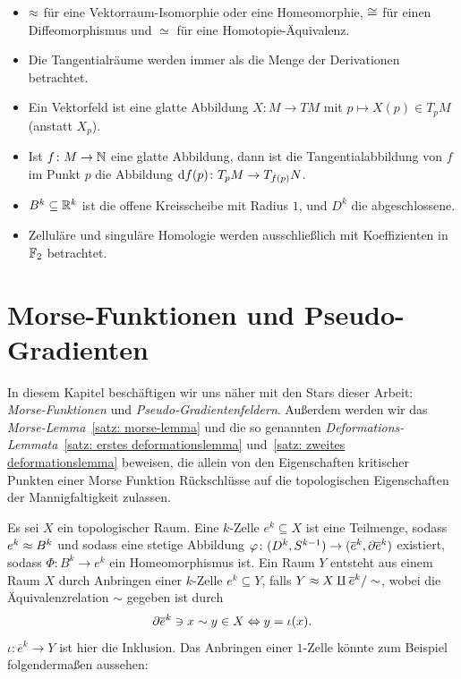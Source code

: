\documentclass[a4paper,11pt,twoside]{scrreport}
\begin{document}
\begin{itemize}
    \item $\approx$ für eine Vektorraum-Isomorphie oder eine Homeomorphie, $\cong$ für einen Diffeomorphismus
        und $\simeq$ für eine Homotopie-Äquivalenz.
    \item Die Tangentialräume werden immer als die Menge der Derivationen betrachtet.
    \item Ein Vektorfeld ist eine glatte Abbildung $X \colon M \to TM$ mit 
        $p \mapsto X(p) \in T_pM$ (anstatt $X_p$).
    \item Ist $f \colon M \to { \mathbb N }$ eine glatte Abbildung, dann ist die Tangentialabbildung
        von $f$ im Punkt $p$ die Abbildung ${ \operatorname{d} } f (p) \colon T_pM \to T_{f(p)}N$.
    \item $B^k \subseteq { \mathbb R }^k$ ist die offene Kreisscheibe mit Radius $1$, und $D^k$
        die abgeschlossene.
    \item Zelluläre und singuläre Homologie werden ausschließlich mit Koeffizienten in ${ \mathbb F }_2$ betrachtet.
\end{itemize}

\tableofcontents

\cleardoublepage

\chapter{Morse-Funktionen und Pseudo-Gradienten}

\makeheaderfancy
\setcounter{page}{1}

In diesem Kapitel beschäftigen wir uns näher mit den Stars dieser Arbeit: \\
\textit{Morse-Funktionen} und \textit{Pseudo-Gradientenfeldern}. Außerdem werden wir das 
\textit{Morse-Lem\-ma}~\ref{satz: morse-lemma} und die so genannten 
\textit{Deformations-Lemmata}~\ref{satz: erstes deformationslemma} und~\ref{satz: zweites deformationslemma} 
beweisen, die allein von den Eigenschaften kritischer Punkten einer Morse Funktion 
Rückschlüsse auf die topologischen Eigenschaften der Mannigfaltigkeit zulassen.

Es sei $X$ ein topologischer Raum. Eine $k$-Zelle $e^k \subseteq X$ ist eine Teilmenge, sodass 
$e^k \approx B^k$ und sodass eine stetige Abbildung 
$\varphi \colon (D^k, S^{k - 1}) \to (\overline{e}^k, { \partial } \overline{e}^k)$ existiert, sodass 
$\Phi \colon B^k \to e^k$ ein Homeomorphismus ist. Ein Raum $Y$ entsteht aus einem Raum $X$
durch Anbringen einer $k$-Zelle $e^k \subseteq Y$, falls $Y \approx X \amalg \overline{e}^k / \sim$, 
wobei die Äquivalenzrelation $\sim$ gegeben ist durch 
\[ { \partial } \overline{e}^k \ni x \sim y \in X \Leftrightarrow y = \iota (x) . \]
$\iota \colon \overline{e}^k \to Y$ ist hier die Inklusion. Das Anbringen einer $1$-Zelle könnte 
zum Beispiel folgendermaßen aussehen:
\end{document}
